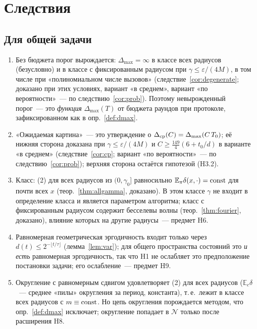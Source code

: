 \documentclass[11pt,a4paper]{article}
\numberwithin{equation}{section}
\theoremstyle{definition}
\theoremstyle{remark}
\newcommand{\E}{\mathbb E}\newcommand{\R}{\mathbb R}\newcommand{\N}{\mathbb N}\let\Prob\relax\newcommand{\Prob}{\mathbb P}
\newcommand{\Dmax}{\Delta_{\max}}\newcommand{\Dcp}{\Delta_{\rm cp}}
\newcommand{\cN}{\mathcal N}\newcommand{\cG}{\mathcal G}\newcommand{\cF}{\mathcal F}\newcommand{\cS}{\mathcal S}
\begin{document}
\section{Следствия}\label{sec:contrib}
\subsection{Для общей задачи}
\begin{enumerate}
\item Без бюджета порог вырождается: $\Dmax=\infty$ в классе всех радиусов (безусловно) и в классе с фиксированным радиусом при $\gamma\le\varepsilon/(4M)$, в том числе при «полиномиальном числе вызовов» (следствие~\ref{cor:degenerate}; доказано при этих условиях, вариант «в среднем», вариант «по вероятности»~--- по следствию~\ref{cor:prob}). Поэтому невырожденный порог~--- это \emph{функция} $\Dmax(T)$ от бюджета раундов при протоколе, зафиксированном как в опр.~\ref{def:dmax}.
\item «Ожидаемая картина»~--- это утверждение о $\Dcp(C)=\Dmax(C\,T_0)$; её нижняя сторона доказана при $\gamma\le\varepsilon/(4M)$ и $C\ge\frac{149}4(6+t_0/d)$ в варианте «в среднем» (следствие~\ref{cor:cp}; вариант «по вероятности»~--- по следствию~\ref{cor:prob}); верхняя сторона остаётся гипотезой (H3.2).
\item Класс: (2) для всех радиусов из $(0,\gamma_0]$ равносильно $\E_\pi\delta(x,\cdot)={\rm const}$ для почти всех $x$ (теор.~\ref{thm:allgamma}, доказано). В этом классе $\gamma$ не входит в определение класса и является параметром алгоритма; класс с фиксированным радиусом содержит бесселевы волны (теор.~\ref{thm:fourier}, доказано), влияние которых на другие радиусы~--- предмет H6.
\item Равномерная геометрическая эргодичность входит только через $d(t)\le2^{-\lfloor t/\tau\rfloor}$ (лемма~\ref{lem:var}); для общего пространства состояний это \emph{и есть} равномерная эргодичность, так что H1 не ослабляет это предположение постановки задачи; его ослабление~--- предмет H9.
\item Округление с равномерным сдвигом удовлетворяет (2) для всех радиусов ($\E_c\delta$~--- среднее «пилы» округления за период, константа), т.\,е.\ лежит в классе всех радиусов с $m\equiv{\rm const}$. Но цепь округления порождается методом, что опр.~\ref{def:dmax} исключает; округление попадает в $\cN$ только после расширения H8.
\end{enumerate}
\end{document}
